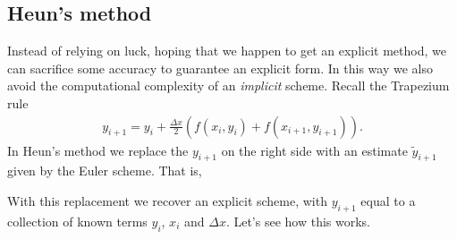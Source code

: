 \subsection{Heun's method}
Instead of relying on luck, hoping that we happen to get an explicit method, we can sacrifice some accuracy to guarantee an explicit form. In this way we also avoid the computational complexity of an \textit{implicit} scheme. Recall the Trapezium rule
\begin{align*}
y_{i+1} = y_i + \frac{\Delta x}{2} \left(f(x_i,y_i) + f(x_{i+1},y_{i+1}) \right).
\end{align*}
In Heun's method we replace the $y_{i+1}$ on the right side with an estimate $\tilde{y}_{i+1}$ given by the Euler scheme. That is,

\vspace{0.2cm}
\noindent {}
\vspace{0.2cm}

With this replacement we recover an explicit scheme, with $y_{i+1}$ equal to a collection of known terms $y_i$, $x_i$ and $\Delta x$. Let's see how this works.

